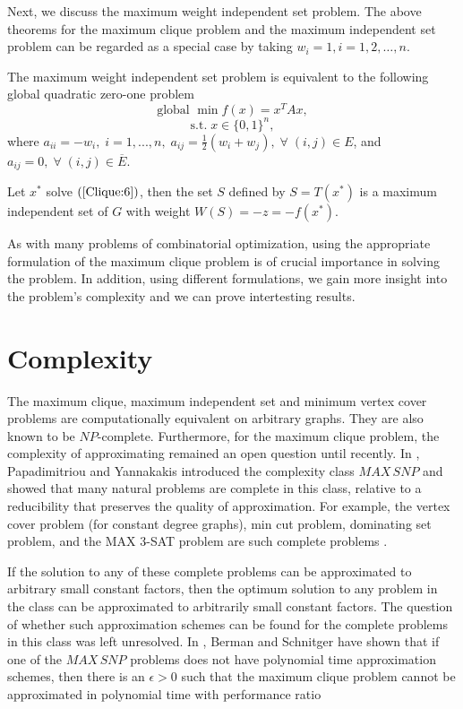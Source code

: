 Next, we discuss the maximum weight independent set problem. The
above theorems for the maximum clique problem and the maximum
independent set problem can be regarded as a special case by taking
$w_i = 1, i = 1, 2, \ldots, n$.

\begin{thm}
The maximum weight independent set problem is equivalent to the
following global quadratic zero-one problem
\begin{equation}
\mbox{global } \min f(x) = {x}^{T} Ax,
	\label{Clique:6}
\end{equation}
\[ \mbox{s.t.} \; x \in { \{ 0,1 \} }^{n}, \]
where $ {a}_{ii} = - {w}_{i}, \; i = 1, ..., n, \;
{a}_{ij} = \frac{1}{2} ({w}_{i} + {w}_{j}), \;
\forall \; (i,j) \in E$, and ${a}_{ij} = 0, \;
\forall \; (i,j) \in \overline{E}$.

Let ${x}^{*}$ solve $(\ref{Clique:6})$, then the set $S$ defined
by $S = T(x^{*})$ is a maximum independent set of $G$ with weight
$W(S) = -z = - f({x}^{*})$.
	\label{thm23}
\end{thm}

As with many problems of combinatorial optimization, using the 
appropriate formulation of the maximum clique problem is of crucial
importance in solving the problem. In addition, using different
formulations, we gain more insight into the problem's complexity
and we can prove intertesting results.

\section{Complexity}

The maximum clique, maximum independent set and minimum vertex cover
problems are computationally equivalent on arbitrary graphs. They
are also known to be $NP$-complete. Furthermore, for the maximum
clique problem, the complexity of approximating remained an open
question until recently. In \cite{PaYa88}, Papadimitriou and
Yannakakis introduced the complexity class $MAX \, SNP$ and showed
that many natural problems are complete in this class, relative to a
reducibility that preserves the quality of approximation. For
example, the vertex cover problem (for constant degree graphs), min
cut problem, dominating set problem, and the MAX 3-SAT problem are
such complete problems \cite{Yan92}.

If the solution to any of these complete problems can be
approximated to arbitrary small constant factors, then the optimum
solution to any problem in the class can be approximated to
arbitrarily small constant factors. The question of whether such
approximation schemes can be found for the complete problems in this
class was left unresolved. In \cite{BeSc89}, Berman and Schnitger
have shown that if one of the $MAX \, SNP$ problems does not have
polynomial time approximation schemes, then there is an $\epsilon >
0$ such that the maximum clique problem cannot be approximated in
polynomial time with performance ratio

